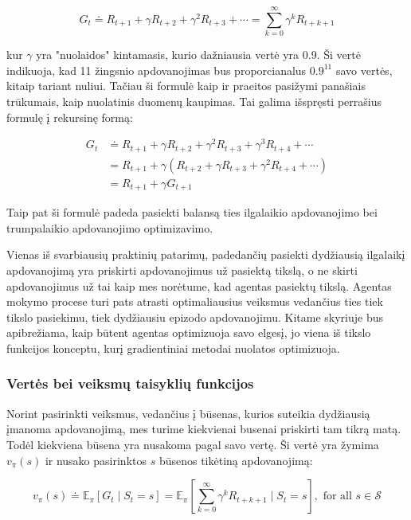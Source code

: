 \documentclass[a4paper, 12pt]{article}
\begin{document}
\begin{equation}
G_{t} \doteq R_{t+1}+\gamma R_{t+2}+\gamma^{2} R_{t+3}+\cdots=\sum_{k=0}^{\infty} \gamma^{k} R_{t+k+1}
\end{equation}

kur $\gamma$ yra "nuolaidos" kintamasis, kurio dažniausia vertė yra 0.9. Ši vertė indikuoja, kad 11 žingsnio apdovanojimas bus proporcianalus $0.9^{11}$ savo vertės, kitaip tariant nuliui. Tačiau ši formulė kaip ir praeitos pasižymi panašiais trūkumais, kaip nuolatinis duomenų kaupimas. Tai galima išspręsti perrašius formulę į rekursinę formą:

\begin{equation}
\begin{aligned}
G_{t} & \doteq R_{t+1}+\gamma R_{t+2}+\gamma^{2} R_{t+3}+\gamma^{3} R_{t+4}+\cdots \\
&=R_{t+1}+\gamma\left(R_{t+2}+\gamma R_{t+3}+\gamma^{2} R_{t+4}+\cdots\right) \\
&=R_{t+1}+\gamma G_{t+1}
\end{aligned}
\end{equation}

Taip pat ši formulė padeda pasiekti balansą ties ilgalaikio apdovanojimo bei trumpalaikio apdovanojimo optimizavimo.

Vienas iš svarbiausių praktinių patarimų, padedančių pasiekti dydžiausią ilgalaikį apdovanojimą yra priskirti apdovanojimus už pasiektą tikslą, o ne skirti apdovanojimus už tai kaip mes norėtume, kad agentas pasiektų tikslą. Agentas mokymo procese turi pats atrasti optimaliausius veiksmus vedančius ties tiek tikslo pasiekimu, tiek dydžiausiu epizodo apdovanojimu. Kitame skyriuje bus apibrežiama, kaip būtent agentas optimizuoja savo elgesį, jo viena iš tikslo funkcijos konceptu, kurį gradientiniai metodai nuolatos optimizuoja.


\subsubsection{Vertės bei veiksmų taisyklių funkcijos}

Norint pasirinkti veiksmus, vedančius į būsenas, kurios suteikia dydžiausią įmanoma apdovanojimą, mes turime kiekvienai busenai priskirti tam tikrą matą. Todėl kiekviena būsena yra nusakoma pagal savo vertę. Ši vertė yra žymima $v_\pi(s)$ ir nusako pasirinktos $s$ būsenos tikėtiną apdovanojimą: 

\begin{equation}
v_{\pi}(s) \doteq \mathbb{E}_{\pi}\left[G_{t} \mid S_{t}=s\right]=\mathbb{E}_{\pi}\left[\sum_{k=0}^{\infty} \gamma^{k} R_{t+k+1} \mid S_{t}=s\right], \text { for all } s \in \mathcal{S}
\end{equation}
\end{document}
